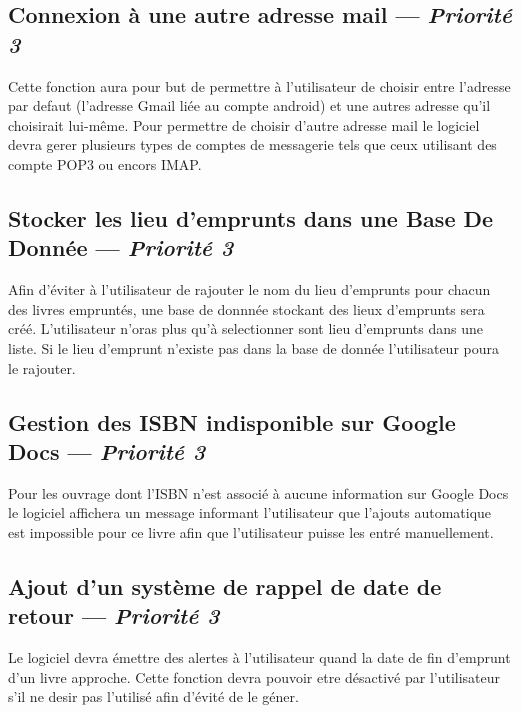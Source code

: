 


\subsection[Connexion à une autre adresse mail]{Connexion à une autre adresse mail — \emph{Priorité 3}}
Cette fonction aura pour but de permettre à l'utilisateur de choisir entre l'adresse par defaut (l'adresse Gmail liée au compte android) et une autres adresse qu'il choisirait lui-même. Pour permettre de choisir d'autre adresse mail le logiciel devra gerer plusieurs types de comptes de messagerie tels que ceux utilisant des compte POP3 ou encors IMAP.

\subsection[Stocker les lieu d'emprunts dans une Base De Donnée]{Stocker les lieu d'emprunts dans une Base De Donnée — \emph{Priorité 3}}
Afin d'éviter à l'utilisateur de rajouter le nom du lieu d'emprunts pour chacun des livres empruntés, une base de donnnée stockant des lieux d'emprunts sera créé. L'utilisateur n'oras plus qu'à selectionner sont lieu d'emprunts dans une liste. Si le lieu d'emprunt n'existe pas dans la base de donnée l'utilisateur poura le rajouter.

\subsection[Gestion des ISBN indisponible sur Google Docs]{Gestion des ISBN indisponible sur Google Docs — \emph{Priorité 3}}
Pour les ouvrage dont l'ISBN n'est associé à aucune information sur Google Docs le logiciel affichera un message informant l'utilisateur que l'ajouts automatique est impossible pour ce livre afin que l'utilisateur puisse les entré manuellement.   

\subsection[Ajout d'un système de rappel de date de retour]{Ajout d'un système de rappel de date de retour — \emph{Priorité 3}}
Le logiciel devra émettre des alertes à l'utilisateur quand la date de fin d'emprunt d'un livre approche. Cette fonction devra pouvoir etre désactivé par l'utilisateur s'il ne desir pas l'utilisé afin d'évité de le géner.


